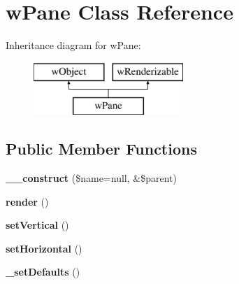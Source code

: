 \hypertarget{classwPane}{
\section{wPane Class Reference}
\label{classwPane}
}
Inheritance diagram for wPane:\begin{figure}[H]
\begin{center}
\leavevmode
\includegraphics[height=2.000000cm]{classwPane}
\end{center}
\end{figure}
\subsection*{Public Member Functions}
\begin{DoxyCompactItemize}
\item 
\hypertarget{classwPane_af29a9a02589ce446d95b6db723513c4f}{
{\bfseries \_\-\_\-construct} (\$name=null, \&\$parent)}
\label{classwPane_af29a9a02589ce446d95b6db723513c4f}

\item 
\hypertarget{classwPane_a47d4d1cdd559921d86edc76a04772c56}{
{\bfseries render} ()}
\label{classwPane_a47d4d1cdd559921d86edc76a04772c56}

\item 
\hypertarget{classwPane_aa17d6c28641cadc85f68fdc94f7e328d}{
{\bfseries setVertical} ()}
\label{classwPane_aa17d6c28641cadc85f68fdc94f7e328d}

\item 
\hypertarget{classwPane_a4a1147f653f59751d095c9741f984381}{
{\bfseries setHorizontal} ()}
\label{classwPane_a4a1147f653f59751d095c9741f984381}

\item 
\hypertarget{classwPane_a62b27b879a9ed0a313ffcb12be9cefb1}{
{\bfseries \_\-setDefaults} ()}
\label{classwPane_a62b27b879a9ed0a313ffcb12be9cefb1}

\end{DoxyCompactItemize}
